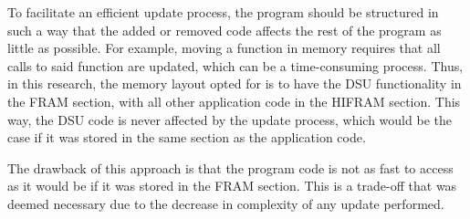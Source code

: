 To facilitate an efficient update process, the program should be structured in such a way that the added or removed code affects the rest of the program as little as possible. For example, moving a function in memory requires that all calls to said function are updated, which can be a time-consuming process. Thus, in this research, the memory layout opted for is to have the DSU functionality in the FRAM section, with all other application code in the HIFRAM section. This way, the DSU code is never affected by the update process, which would be the case if it was stored in the same section as the application code. 

The drawback of this approach is that the program code is not as fast to access as it would be if it was stored in the FRAM section. This is a trade-off that was deemed necessary due to the decrease in complexity of any update performed.  
